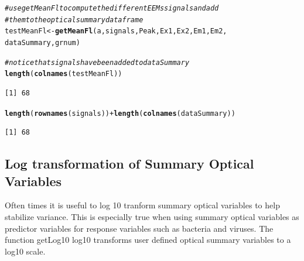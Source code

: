 \documentclass[a4paper,11pt]{article}\usepackage[]{graphicx}\usepackage[]{color}
\makeatletter
\newcommand{\hlcom}[1]{\textcolor[rgb]{0.678,0.584,0.686}{\textit{#1}}}%
\newcommand{\hlopt}[1]{\textcolor[rgb]{0,0,0}{#1}}%
\newcommand{\hlstd}[1]{\textcolor[rgb]{0.345,0.345,0.345}{#1}}%
\newcommand{\hlkwb}[1]{\textcolor[rgb]{0.69,0.353,0.396}{#1}}%
\newcommand{\hlkwd}[1]{\textcolor[rgb]{0.737,0.353,0.396}{\textbf{#1}}}%
\newenvironment{kframe}{%
 \def\at@end@of@kframe{}%
 \ifinner\ifhmode%
  \def\at@end@of@kframe{\end{minipage}}%
  \begin{minipage}{\columnwidth}%
 \fi\fi%
 \def\FrameCommand##1{\hskip\@totalleftmargin \hskip-\fboxsep
 \colorbox{shadecolor}{##1}\hskip-\fboxsep
     \hskip-\linewidth \hskip-\@totalleftmargin \hskip\columnwidth}%
 \MakeFramed {\advance\hsize-\width
   \@totalleftmargin\z@ \linewidth\hsize
   \@setminipage}}%
 {\par\unskip\endMakeFramed%
 \at@end@of@kframe}
\newenvironment{knitrout}{}{} %
\makeatother
\begin{document}
\begin{knitrout}
\begin{kframe}
\begin{alltt}
\hlcom{# use getMeanFl to compute the different EEMs signals and add}
\hlcom{# them to the optical summary data frame}
\hlstd{testMeanFl} \hlkwb{<-} \hlkwd{getMeanFl}\hlstd{(a, signals, Peak, Ex1, Ex2, Em1, Em2,}
    \hlstd{dataSummary, grnum)}

\hlcom{# notice that signals have been added to dataSummary}
\hlkwd{length}\hlstd{(}\hlkwd{colnames}\hlstd{(testMeanFl))}
\end{alltt}
\begin{verbatim}
[1] 68
\end{verbatim}
\begin{alltt}
\hlkwd{length}\hlstd{(}\hlkwd{rownames}\hlstd{(signals))} \hlopt{+} \hlkwd{length}\hlstd{(}\hlkwd{colnames}\hlstd{(dataSummary))}
\end{alltt}
\begin{verbatim}
[1] 68
\end{verbatim}
\end{kframe}
\end{knitrout}

\subsection{Log transformation of Summary Optical Variables}
Often times it is useful to log 10 tranform summary optical variables to help stabilize variance.  This is especially true when using summary optical variables as predictor variables for response variables such as bacteria and viruses. The function getLog10 log10 transforms user defined optical summary variables to a log10 scale.
\end{document}
